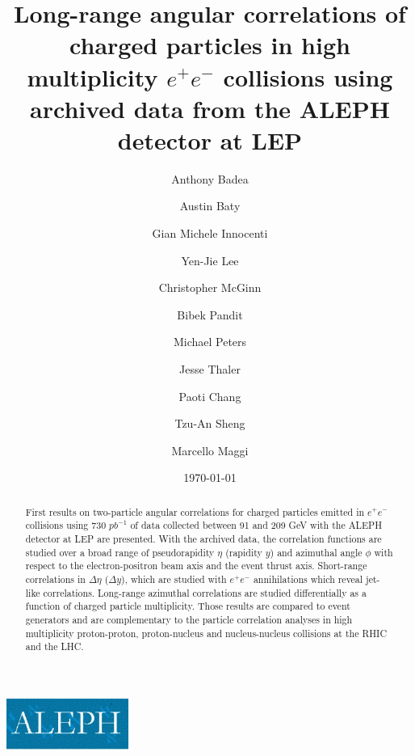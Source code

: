 \documentclass[%
preprint,
bibnotes,
]{revtex4-1}
\begin{document}
\includegraphics[width= 40mm]{aleph-logo.jpg}
\title{Long-range angular correlations of charged particles in high multiplicity $e^+e^-$ collisions using archived data from the ALEPH detector at LEP}%

\author{Anthony Badea}%
\author{Austin Baty}%
\author{Gian Michele Innocenti}%
\author{Yen-Jie Lee}
\author{Christopher McGinn}
\author{Bibek Pandit}%
\author{Michael Peters}%
\author{Jesse Thaler}%



\author{Paoti Chang}
\author{Tzu-An Sheng}

%

\author{Marcello Maggi}

\date{\today}%

\begin{abstract}
First results on two-particle angular correlations for charged particles emitted in $e^+e^-$ collisions using 730 $pb^{-1}$ of data collected between 91 and 209 GeV with the ALEPH detector at LEP are presented. With the archived data, the correlation functions are studied over a broad range of pseudorapidity $\eta$ (rapidity $y$) and azimuthal angle $\phi$ with respect to the electron-positron beam axis
and the event thrust axis. Short-range correlations in $\Delta\eta$ ($\Delta y$), which are studied with $e^+e^-$ annihilations which reveal jet-like correlations. Long-range azimuthal correlations are studied differentially as a function of charged particle multiplicity. Those results are compared to event generators and are complementary to the particle correlation analyses in high multiplicity proton-proton, proton-nucleus and nucleus-nucleus collisions at the RHIC and the LHC.
\end{abstract}
\end{document}
